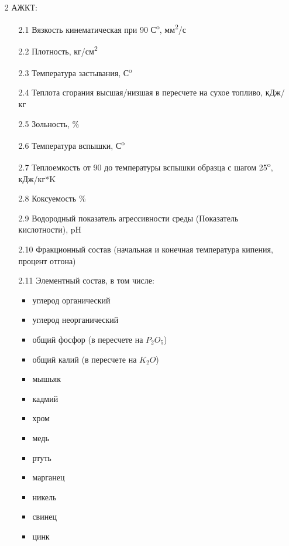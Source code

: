 \documentclass[russian,utf8]{eskdtext}
\begin{document}
\begin{enumerate}
   \item[2] АЖКТ:
      \begin{enumerate}
      \item[2.1] Вязкость кинематическая при 90 С\textsuperscript{o}, мм\textsuperscript{2}/с 
      \item[2.2] Плотность, кг/см\textsuperscript{2}
      \item[2.3] Температура застывания, С\textsuperscript{o}
      \item[2.4] Теплота сгорания высшая/низшая в пересчете на сухое топливо, кДж/кг
      \item[2.5] Зольность, \%
      \item[2.6] Температура вспышки, С\textsuperscript{o}
      \item[2.7] Теплоемкость от 90 до температуры вспышки образца с шагом 25\textsuperscript{o}, кДж/кг*K 
      \item[2.8] Коксуемость \%
      \item[2.9] Водородный показатель агрессивности среды (Показатель кислотности), pH
      \item[2.10] Фракционный состав (начальная и конечная температура кипения, процент отгона)
      \item[2.11] Элементный состав, в том числе:
      \begin{itemize}
            \item углерод органический
            \item углерод неорганический
            \item общий фосфор (в пересчете на  $P_{2}O_{5}$)
            \item общий калий (в пересчете на  $K_{2}O$)
            \item мышьяк  
            \item кадмий
            \item хром 
            \item медь 
            \item ртуть
            \item марганец 
            \item никель 
            \item свинец 
            \item цинк 
      		\end{itemize}
      \end{enumerate}
      

\end{enumerate}
\end{document}
